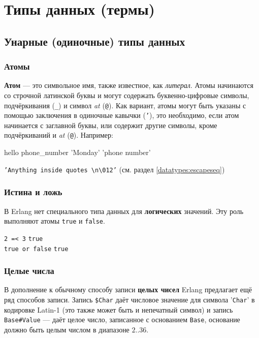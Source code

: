 \chapter{Типы данных (термы)}
\label{datatypes}


\section{Унарные (одиночные) типы данных}


\subsection{Атомы}
\label{datatypes:atom}
\textbf{Атом} --- это символьное имя, также известное, как \emph{литерал}.
Атомы начинаются со строчной латинской буквы и могут содержать буквенно-цифровые
символы, подчёркивания (\texttt{\_}) и символ \emph{at} (\texttt{@}).
Как вариант, атомы могут быть указаны с помощью заключения в одиночные кавычки
(\texttt{'}), это необходимо, если атом начинается с заглавной буквы, или 
содержит другие символы, кроме подчёркиваний и \emph{at} (\texttt{@}). 
Например:

\begin{erlang}
hello
phone_number
'Monday'
'phone number'
\end{erlang}

\texttt{'Anything inside quotes \textbackslash n\textbackslash 012'}
\hfill(см. раздел \ref{datatypes:escapeseq})


\subsection{Истина и ложь}
\label{datatypes:boolean}

В Erlang нет специального типа данных для \textbf{логических} значений. Эту роль
выполняют атомы \texttt{true} и \texttt{false}.

\texttt{2 =< 3} \resultingin \texttt{true} \\
\texttt{true or false} \resultingin \texttt{true}


\subsection{Целые числа}
\label{datatypes:integer}

В дополнение к обычному способу записи \textbf{целых чисел} Erlang предлагает
ещё ряд способов записи. Запись \texttt{\$Char} даёт числовое значение для 
символа '\texttt{Char}' в кодировке Latin-1 (это также может быть и непечатный
символ) и запись\linebreak
\texttt{Base\#Value} --- даёт целое число, записанное с основанием
\texttt{Base}, основание должно быть целым числом в диапазоне $2..36$.

